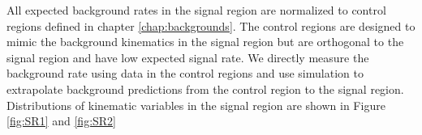 \indent All expected background rates in the signal region are normalized to control regions defined in chapter \ref{chap:backgrounds}.  The control regions are designed to mimic the background kinematics in the signal region but are orthogonal to the signal region and have low expected signal rate.  We directly measure the background rate using data in the control regions and use simulation to extrapolate background predictions from the control region to the signal region. \\


%

%    
%    
%    
%    
%    

\indent Distributions of kinematic variables in the signal region are shown in Figure \ref{fig:SR1} and \ref{fig:SR2}\\

